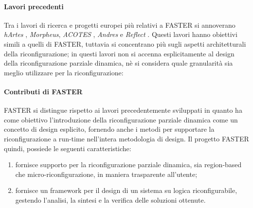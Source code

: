 \paragraph{Lavori precedenti}
Tra i lavori di ricerca e progetti europei più relativi a \ac{FASTER} si 
annoverano \emph{hArtes} \cite{HArtes}, \emph{Morpheus}, \emph{ACOTES} 
\cite{AcotesUrl, ACOTES}, \emph{Andres} e \emph{Reflect} \cite{Reflect}.
Questi lavori hanno obiettivi simili a quelli di \ac{FASTER}, tuttavia si 
concentrano più sugli aspetti architetturali della riconfigurazione; in questi 
lavori non si accenna esplicitamente al design della riconfigurazione parziale 
dinamica, nè si considera quale granularità sia meglio utilizzare per la 
riconfigurazione: 


\paragraph{Contributi di \ac{FASTER}}
\ac{FASTER} si distingue rispetto ai lavori precedentemente sviluppati in 
quanto ha come obiettivo l'introduzione della riconfigurazione parziale 
dinamica come un concetto di design esplicito, fornendo anche i metodi per 
supportare la riconfigurazione a run-time nell'intera metodologia di design.
Il progetto \ac{FASTER} quindi, possiede le seguenti caratteristiche:
\begin{enumerate}
 \item fornisce supporto per la riconfigurazione parziale 
dinamica, sia region-based che micro-riconfigurazione, in maniera trasparente 
all'utente;
 \item fornisce un framework per il design di un sistema su logica 
riconfigurabile, gestendo l'analisi, la sintesi e la verifica delle soluzioni 
ottenute.
\end{enumerate}

